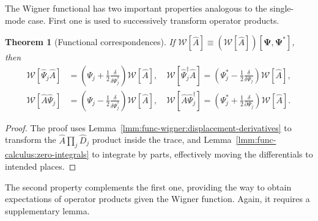 \documentclass[12pt,aip,jmp,amssymb,amsmath]{revtex4-1}
\newcommand{\bPsi}{\boldsymbol{\Psi}}
\newcommand{\Psiop}{\hat{\Psi}}
\newcommand{\lmmref}[1]{Lemma~\ref{lmm:#1}}
\newtheorem{theorem}{Theorem}
\begin{document}
The Wigner functional has two important properties analogous to the single-mode case.
First one is used to successively transform operator products.

\begin{theorem}[Functional correspondences]
\label{thm:func-wigner:correspondences}
    If $\mathcal{W} [ \hat{A} ] \equiv (\mathcal{W} [ \hat{A} ]) [\bPsi, \bPsi^*]$, then
    \begin{equation*}\begin{split}
        \mathcal{W} [ \Psiop_j \hat{A} ]
            & = \left( \Psi_j + \frac{1}{2} \frac{\delta}{\delta \Psi_j^*} \right) \mathcal{W}[\hat{A}],
        \quad
        \mathcal{W} [ \Psiop_j^\dagger \hat{A} ]
            = \left( \Psi_j^* - \frac{1}{2} \frac{\delta}{\delta \Psi_j} \right) \mathcal{W}[\hat{A}], \\
        \mathcal{W} [ \hat{A} \Psiop_j ]
            & = \left( \Psi_j - \frac{1}{2} \frac{\delta}{\delta \Psi_j^*} \right) \mathcal{W}[\hat{A}],
        \quad
        \mathcal{W} [ \hat{A} \Psiop_j^\dagger ]
            = \left( \Psi_j^* + \frac{1}{2} \frac{\delta}{\partial \Psi_j} \right) \mathcal{W}[\hat{A}].
    \end{split}\end{equation*}
\end{theorem}
\begin{proof}
The proof uses \lmmref{func-wigner:displacement-derivatives} to transform the $\hat{A} \prod_j \hat{D}_j$ product inside the trace, and \lmmref{func-calculus:zero-integrals} to integrate by parts, effectively moving the differentials to intended places.
\end{proof}

The second property complements the first one, providing the way to obtain expectations of operator products given the Wigner function.
Again, it requires a supplementary lemma.
\end{document}
